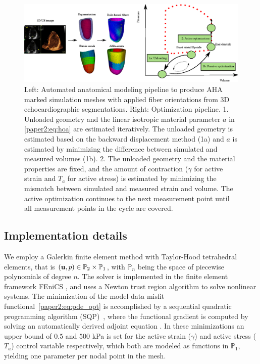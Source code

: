\begin{figure}[htbp]
\centering
    \includegraphics[width=\textwidth]{models}
\caption{Left: Automated anatomical modeling pipeline to produce AHA
  marked simulation meshes with applied fiber orientations from 3D
  echocardiographic segmentations. Right: Optimization
  pipeline. 1. Unloaded geometry and the linear isotropic
  material parameter $a$ in \eqref{paper2:eq:hoa} are estimated iteratively. The unloaded geometry is
  estimated based on the backward displacement method (1a)
  \cite{nikou2016effects} and $a$ is estimated by minimizing the
  difference between simulated and measured volumes (1b). 2. The unloaded
  geometry and the material properties are fixed, and the amount of
  contraction ($\gamma$ for active strain and $T_a$ for active stress)
  is estimated by minimizing the mismatch between simulated and
  measured strain and volume. The active optimization continues to the
  next measurement point until all measurement points in the cycle are covered.}
\label{paper2:fig:pipeline}
\end{figure}

\subsection{Implementation details}
We employ a Galerkin finite element method with Taylor-Hood
tetrahedral elements, that is $(\mathbf{u}, p) \in \mathbb{P}_2 \times
\mathbb{P}_1 $, with $\mathbb{P}_n$ being the space of piecewise
polynomials of degree $n$.
The solver is implemented in the finite element framework FEniCS
\cite{logg2012automated}, and uses a Newton trust region algorithm
\cite{PETScPackage} to solve nonlinear systems. The minimization of the
model-data misfit functional~\eqref{paper2:eq:pde_opt} is accomplished by a sequential
quadratic programming algorithm (SQP)~\cite{kraft1988software}, where
the functional gradient is computed by solving an automatically derived adjoint
equation \cite{farrell2013automated}. In these minimizations an upper
bound of $0.5$ and $500$ kPa is set for the active strain ($\gamma$)
and active stress ($T_a$) control variable respectively, which both
are modeled as functions in $\mathbb{P}_1$, yielding one parameter per
nodal point in the mesh.

